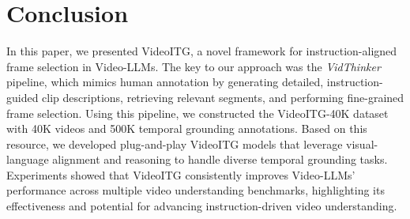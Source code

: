 
\section{Conclusion}
In this paper, we presented VideoITG, a novel framework for instruction-aligned frame selection in Video-LLMs. The key to our approach was the \textit{VidThinker} pipeline, which mimics human annotation by generating detailed, instruction-guided clip descriptions, retrieving relevant segments, and performing fine-grained frame selection. Using this pipeline, we constructed the VideoITG-40K dataset with 40K videos and 500K temporal grounding annotations. Based on this resource, we developed plug-and-play VideoITG models that leverage visual-language alignment and reasoning to handle diverse temporal grounding tasks. Experiments showed that VideoITG consistently improves Video-LLMs' performance across multiple video understanding benchmarks, highlighting its effectiveness and potential for advancing instruction-driven video understanding.


